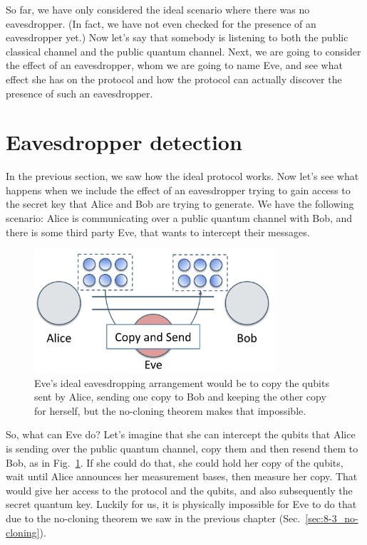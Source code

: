 So far, we have only considered the ideal scenario where there was no eavesdropper.  (In fact, we have not even checked for the presence of an eavesdropper yet.) Now let's say that somebody is listening to both the public classical channel and the public quantum channel. Next, we are going to consider the effect of an eavesdropper, whom we are going to name Eve, and see what effect she has on the protocol and how the protocol can actually discover the presence of such an eavesdropper.

\section{Eavesdropper detection}

In the previous section, we saw how the ideal protocol works. Now let's see what happens when we include the effect of an eavesdropper trying to gain access to the secret key that Alice and Bob are trying to generate.  We have the following scenario: Alice is communicating over a public quantum channel with Bob, and there is some third party Eve, that wants to intercept their messages.


\begin{figure}[H]
    \centering
    \includegraphics[width=0.8\textwidth]{lesson9/eve-copy-and-send.png}
        \caption[Eve's ideal (but impossible) eavesdropping arrangement]{Eve's ideal eavesdropping arrangement would be to copy the qubits sent by Alice, sending one copy to Bob and keeping the other copy for herself, but the no-cloning theorem makes that impossible.}
    \label{fig:eve-copy-and-send}
\end{figure}


So, what can Eve do? Let's imagine that she can intercept the qubits that Alice is sending over the public quantum channel, copy them and then resend them to Bob, as in Fig.~\ref{fig:eve-copy-and-send}. If she could do that, she could hold her copy of the qubits, wait until Alice announces her measurement bases, then measure her copy.  That would give her access to the protocol and the qubits, and also subsequently the secret quantum key. Luckily for us, it is physically impossible for Eve to do that due to the no-cloning theorem we saw in the previous chapter (Sec.~\ref{sec:8-3_no-cloning}).

